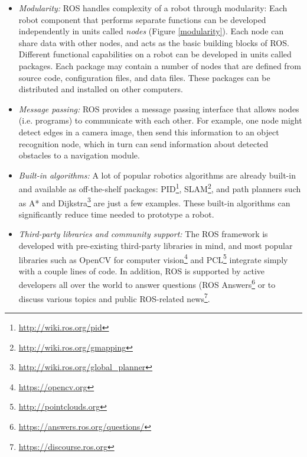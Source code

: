 \begin{itemize}
    \item{\textit{Modularity:}} ROS handles complexity of a robot through modularity: Each robot component that performs separate functions can be developed independently in units called \textit{nodes} (Figure \ref{modularity}). Each node can share data with other nodes, and acts as the basic building blocks of ROS. Different functional capabilities on a robot can be developed in units called packages. Each package may contain a number of nodes that are defined from source code, configuration files, and data files. These packages can be distributed and installed on other computers. 

    \item{\textit{Message passing:}} ROS provides a message passing interface that allows nodes (i.e. programs) to communicate with each other. For example, one node might detect edges in a camera image, then send this information to an object recognition node, which in turn can send information about detected obstacles to a navigation module.
    
    \item{\textit{Built-in algorithms:}} A lot of popular robotics algorithms are already built-in and available as off-the-shelf packages: PID\footnote{\url{http://wiki.ros.org/pid}}, SLAM\footnote{\url{http://wiki.ros.org/gmapping}}, and path planners such as A* and Dijkstra\footnote[][2\baselineskip]{ \url{http://wiki.ros.org/global_planner}} are just a few examples. These built-in algorithms can significantly reduce time needed to prototype a robot.
  
    \item{\textit{Third-party libraries and community support:}} The ROS framework is developed with pre-existing third-party libraries in mind, and most popular libraries such as OpenCV for computer vision\footnote{\url{https://opencv.org}} and PCL\footnote{\url{http://pointclouds.org}} integrate simply with a couple lines of code. In addition, ROS is supported by active developers all over the world to answer questions (ROS Answers\footnote{\url{https://answers.ros.org/questions/}} or to discuss various topics and public ROS-related news\footnote{\url{https://discourse.ros.org}}. 
\end{itemize}

